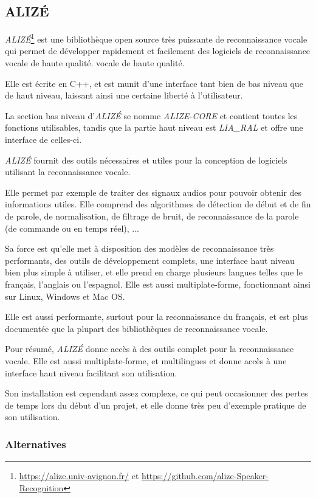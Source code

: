 
\subsection{ALIZÉ}
\label{subsec:ALIZE}
\textit{ALIZÉ}\footnote{\url{https://alize.univ-avignon.fr/} et \url{https://github.com/alize-Speaker-Recognition}} est une bibliothèque open source très puissante de reconnaissance vocale
qui permet de développer rapidement et facilement des logiciels de reconnaissance vocale de haute qualité.
vocale de haute qualité.

Elle est écrite en C++, et est munit d'une interface tant bien de bas niveau que de haut niveau, laissant ainsi une certaine liberté à l'utilisateur.

La section bas niveau d'\textit{ALIZÉ} se nomme \textit{ALIZE-CORE} et contient toutes les fonctions utilisables, tandis que la partie haut niveau est \textit{LIA\_RAL} et offre une interface de celles-ci.

\textit{ALIZÉ} fournit des outils nécessaires et utiles pour la conception de logiciels utilisant la reconnaissance vocale.

Elle permet par exemple de traiter des signaux audios pour pouvoir obtenir des informations utiles. Elle comprend des algorithmes de détection de début et de fin de parole, de normalisation,
de filtrage de bruit, de reconnaissance de la parole (de commande ou en temps réel), ...

Sa force est qu'elle met à disposition des modèles de reconnaissance très performants, des outils de développement complets, une interface haut niveau bien plus simple à utiliser, et
elle prend en charge plusieurs langues telles que le français, l'anglais ou l'espagnol. Elle est aussi multiplate-forme, fonctionnant ainsi sur Linux, Windows et Mac OS.

Elle est aussi performante, surtout pour la reconnaissance du français, et est plus documentée que la plupart des bibliothèques de reconnaissance vocale.

Pour résumé, \textit{ALIZÉ} donne accès à des outils complet pour la reconnaissance vocale. Elle est aussi multiplate-forme, et multilingues et donne accès
à une interface haut niveau facilitant son utilisation.

Son installation est cependant assez complexe, ce qui peut occasionner des pertes de temps lors du début d'un projet, et elle donne très peu d'exemple pratique de son utilisation.


\subsubsection*{Alternatives}

